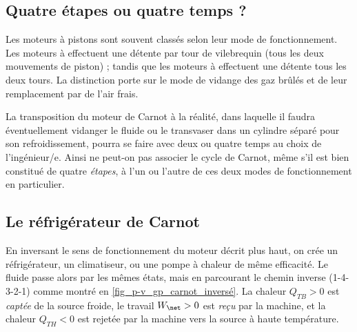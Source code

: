 \begin{anexample}
		\end{anexample}
		

	\subsection{Quatre étapes ou quatre temps ?}
	
		Les moteurs à pistons sont souvent classés selon leur mode de fonctionnement. Les moteurs à  effectuent une détente par tour de vilebrequin (tous les deux mouvements de piston) ; tandis que les moteurs à  effectuent une détente tous les deux tours. La distinction porte sur le mode de vidange des gaz brûlés et de leur remplacement par de l’air frais.
		
		La transposition du moteur de Carnot à la réalité, dans laquelle il faudra éventuellement vidanger le fluide ou le transvaser dans un cylindre séparé pour son refroidissement, pourra se faire avec deux ou quatre temps au choix de l’ingénieur/e. Ainsi ne peut-on pas associer le cycle de Carnot, même s’il est bien constitué de quatre \emph{étapes}, à l’un ou l’autre de ces deux modes de fonctionnement en particulier.
		

	\subsection{Le réfrigérateur de Carnot}

		En inversant le sens de fonctionnement du moteur décrit plus haut, on crée un réfrigérateur, un climatiseur, ou une pompe à chaleur de même efficacité. Le fluide passe alors par les mêmes états, mais en parcourant le chemin inverse (1-4-3-2-1) comme montré en \cref{fig_p-v_gp_carnot_inversé}. La chaleur $Q_{TB} > 0$ est \emph{captée} de la source froide, le travail $W_\net > 0$ est \emph{reçu} par la machine, et la chaleur $Q_{TH} < 0$ est rejetée par la machine vers la source à haute température.


